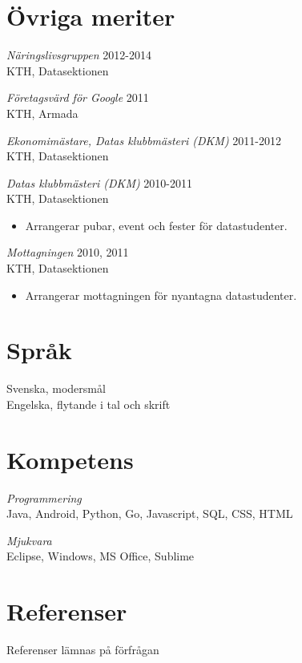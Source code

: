 \documentclass[margin, 10pt]{res} %
\begin{document}
\begin{resume}
\section{Övriga meriter}

{\sl Näringslivsgruppen} \hfill 2012-2014 \\
KTH, Datasektionen


{\sl Företagsvärd för Google} \hfill 2011 \\
KTH, Armada

{\sl Ekonomimästare, Datas klubbmästeri (DKM)} \hfill 2011-2012 \\
KTH, Datasektionen

{\sl Datas klubbmästeri (DKM)} \hfill 2010-2011 \\
KTH, Datasektionen
\begin{itemize} 
\item Arrangerar pubar, event och fester för datastudenter.
\end{itemize} 

{\sl Mottagningen} \hfill 2010, 2011 \\
KTH, Datasektionen
\begin{itemize} 
\item Arrangerar mottagningen för nyantagna datastudenter.
\end{itemize} 


\section{Språk}
Svenska, modersmål \\
Engelska, flytande i tal och skrift


\section{Kompetens}
{\sl Programmering} \\
Java, Android, Python, Go, Javascript, SQL, CSS, HTML

{\sl Mjukvara} \\
Eclipse, Windows, MS Office, Sublime


\section{Referenser}
Referenser lämnas på förfrågan


\end{resume}
\end{document}
